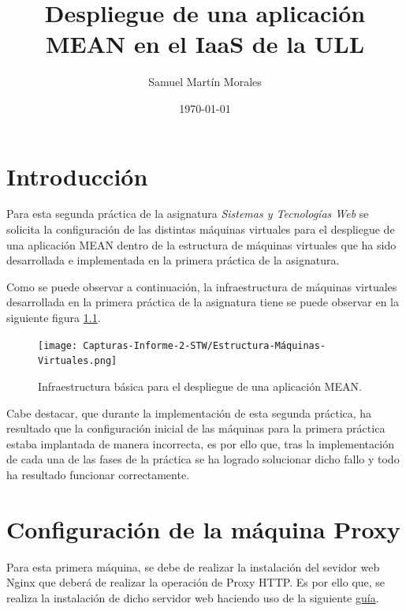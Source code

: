 \documentclass{report}
\begin{document}
	
	
	\title{Despliegue de una aplicación MEAN en el IaaS de la ULL}
	\author{Samuel Martín Morales}
	\date{\today}
	
	\maketitle
	
	\tableofcontents
	
	\chapter{Introducción}
  Para esta segunda práctica de la asignatura \emph{Sistemas y Tecnologías Web} se solicita la configuración de las distintas máquinas virtuales para el despliegue de una aplicación MEAN dentro de la estructura de máquinas virtuales que ha sido desarrollada e implementada en la primera práctica de la asignatura.

  Como se puede observar a continuación, la infraestructura de máquinas virtuales desarrollada en la primera práctica de la asignatura tiene se puede observar en la siguiente figura \ref{fig:Estrcutura-Máquinas-Virtuales}. 
	
	\begin{figure}[H]
		\centering
		\texttt{[image: Capturas-Informe-2-STW/Estructura-Máquinas-Virtuales.png]}
		\caption{Infraestructura básica para el despliegue de una aplicación MEAN.}
		\label{fig:Estrcutura-Máquinas-Virtuales}
	\end{figure}

  Cabe destacar, que durante la implementación de esta segunda práctica, ha resultado que la configuración inicial de las máquinas para la primera práctica estaba implantada de manera incorrecta, es por ello que, tras la implementación de cada una de las fases de la práctica se ha logrado solucionar dicho fallo y todo ha resultado funcionar correctamente.
	
	\chapter{Configuración de la máquina Proxy}
	Para esta primera máquina, se debe de realizar la instalación del sevidor web Nginx que deberá de realizar la operación de Proxy HTTP. Es por ello que, se realiza la instalación de dicho servidor web haciendo uso de la siguiente \href{https://linuxize.com/post/how-to-install-nginx-on-debian-9/}{guía}.
\end{document}
